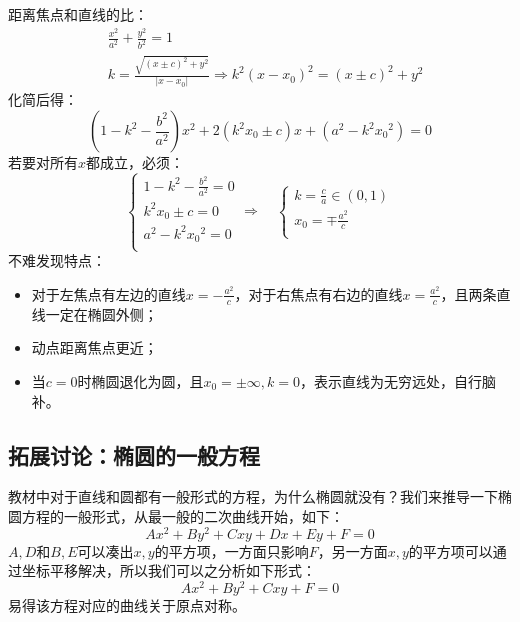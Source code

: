 距离焦点和直线的比：
\begin{align*}
&\frac{x^2}{a^2}+\frac{y^2}{b^2}=1 \\
&k=\frac{\sqrt{\left( x\pm c \right) ^2+y^2}}{\left| x-x_0 \right|}\Rightarrow k^2\left( x-x_0 \right) ^2=\left( x\pm c \right) ^2+y^2
\end{align*}
化简后得：
\[
\left( 1-k^2-\frac{b^2}{a^2} \right) x^2+2\left( k^2x_0\pm c \right) x+\left( a^2-k^2{x_0}^2 \right) =0
\]
若要对所有$x$都成立，必须：
\[
\begin{cases}
	1-k^2-\frac{b^2}{a^2}=0\\
	k^2x_0\pm c=0\\
	a^2-k^2{x_0}^2=0\\
\end{cases}\Rightarrow \quad \begin{cases}
	k=\frac{c}{a}\in \left( 0,1 \right) \\
	x_0=\mp \frac{a^2}{c}\\
\end{cases}
\]
不难发现特点：
\begin{itemize}
    \item 对于左焦点有左边的直线$x=-\frac{a^2}{c}$，对于右焦点有右边的直线$x=\frac{a^2}{c}$，且两条直线一定在椭圆外侧；
    \item 动点距离焦点更近；
    \item 当$c=0$时椭圆退化为圆，且$x_0=\pm \infty ,k=0$，表示直线为无穷远处，自行脑补。
\end{itemize}

\subsection{拓展讨论：椭圆的一般方程}

教材中对于直线和圆都有一般形式的方程，为什么椭圆就没有？我们来推导一下椭圆方程的一般形式，从最一般的二次曲线开始，如下：
\[
Ax^2+By^2+Cxy+Dx+Ey+F=0
\]
$A,D$和$B,E$可以凑出$x,y$的平方项，一方面只影响$F$，另一方面$x,y$的平方项可以通过坐标平移解决，所以我们可以之分析如下形式：
\[
Ax^2+By^2+Cxy+F=0
\]
易得该方程对应的曲线关于原点对称。

